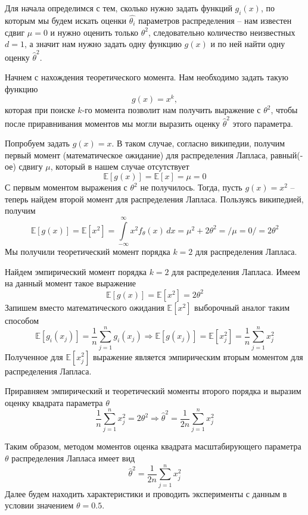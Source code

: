 \documentclass[a4paper, 12pt]{article}
\begin{document}
    Для начала определимся с тем, сколько нужно задать функций $g_i(x)$, по которым мы будем искать оценки $\hat{\theta_i}$
    параметров распределения -- нам известен сдвиг $\mu=0$ и нужно оценить только $\theta^2$, следовательно количество
    неизвестных $d=1$, а значит нам нужно задать одну функцию $g(x)$ и по ней найти одну оценку $\hat{\theta}^2$.


    Начнем с нахождения теоретического момента. Нам необходимо задать такую функцию $$g(x)=x^k,$$ которая
    при поиске $k$-го момента позволит нам получить выражение с $\theta^2$, чтобы после приравнивания моментов
    мы могли выразить оценку $\hat{\theta}^2$ этого параметра.


    Попробуем задать $g(x)=x$. В таком случае, согласно википедии, получим первый момент
    (математическое ожидание) для распределения Лапласа, равный(-ое)
    сдвигу $\mu$, который в нашем случае отсутствует
    $$\mathbb{E}\left[g(x)\right]=\mathbb{E}\left[x\right]=\mu=0$$
    С первым моментом выражения с $\theta^2$ не получилось. Тогда, пусть $g(x)=x^2$ -- теперь
    найдем второй момент для распределения Лапласа. Пользуясь википедией, получим
    $$\mathbb{E}\left[g(x)\right]=\mathbb{E}\left[x^2\right]=\int\limits_{-\infty}^{\infty}x^2f_{\theta}(x)\,dx=\mu^2+2\theta^2=/\mu=0/=2\theta^2$$
    Мы получили теоретический момент порядка $k=2$ для распределения Лапласа.
    
    
    Найдем эмпирический момент порядка $k=2$ для распределения Лапласа. Имеем на данный момент такое выражение
    $$\mathbb{E}\left[g(x)\right]=\mathbb{E}\left[x^2\right]=2\theta^2$$
    Запишем вместо математического ожидания $\mathbb{E}\left[x^2\right]$ выборочный аналог таким способом
    $$\mathbb{E}\left[g_i(x_j)\right]=\dfrac{1}{n}\sum\limits_{j=1}^{n}g_i(x_j)\Rightarrow \mathbb{E}\left[g(x_j)\right]=\mathbb{E}\left[x_j^2\right]=\dfrac{1}{n}\sum\limits_{j=1}^{n}x_j^2$$
    Полученное для $\mathbb{E}\left[x_j^2\right]$ выражение является эмпирическим вторым моментом для распределения Лапласа.


    Приравняем эмпирический и теоретический моменты второго порядка и выразим оценку квадрата параметра $\theta$
    $$\dfrac{1}{n}\sum\limits_{j=1}^{n}x_j^2=2\theta^2\Rightarrow\hat{\theta}^2=\dfrac{1}{2n}\sum\limits_{j=1}^{n}x_j^2$$


    Таким образом, методом моментов оценка квадрата масштабирующего параметра $\theta$ распределения Лапласа имеет вид
    $$\hat{\theta}^2=\dfrac{1}{2n}\sum\limits_{j=1}^{n}x_j^2$$
    Далее будем находить характеристики и проводить эксперименты с данным в условии значением $\theta=0.5$.
\end{document}
